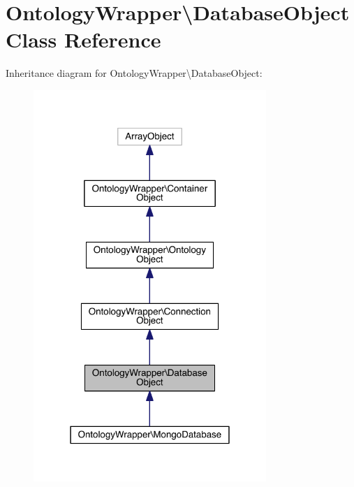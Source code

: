 \hypertarget{class_ontology_wrapper_1_1_database_object}{\section{Ontology\-Wrapper\textbackslash{}Database\-Object Class Reference}
\label{class_ontology_wrapper_1_1_database_object}
}


Inheritance diagram for Ontology\-Wrapper\textbackslash{}Database\-Object\-:\nopagebreak
\begin{figure}[H]
\begin{center}
\leavevmode
\includegraphics[width=250pt]{class_ontology_wrapper_1_1_database_object__inherit__graph}
\end{center}
\end{figure}


